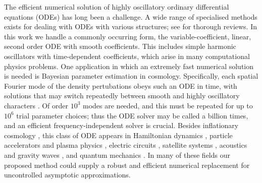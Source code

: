 \documentclass[10pt]{article}
\newcommand{\Fruzsi}[1]{{\color{blue}#1}}
\begin{document}
The efficient numerical solution of highly oscillatory ordinary differential
equations (ODEs) has long been a challenge.
A wide range of specialised methods exists for dealing with ODEs
with various structures;
see \cite{petzold1997,engquist2009} for thorough reviews.
In this work we handle a commonly occurring
form, the variable-coefficient, linear, second
order ODE with
smooth coefficients.
This includes simple %
harmonic oscillators with time-dependent coefficients,
which arise in many computational physics problems.
One application in which an extremely fast numerical solution is needed
is Bayesian parameter estimation in cosmology.
Specifically, each spatial Fourier mode of the density pertubations
obeys such an ODE in time,
with solutions that may switch repeatedly between smooth and
highly oscillatory characters \cite{agocs2020dense}.
Of order $10^3$ modes are needed, and this must be repeated for
up to $10^6$ trial parameter choices; thus the ODE solver
may be called a billion times, and an efficient frequency-independent
solver is crucial.
Besides inflationary cosmology \cite{Hergt2022,martin2003,winitzki2005}, this class of ODE appears in
Hamiltonian dynamics \cite{Pritula2018,fiore2022}, particle accelerators and plasma physics
\cite{courant1958,davidson2001,hazeltine2003,lewis1968}, electric circuits
\cite{likharev2022}, satellite systems \cite{saxena2020}, acoustics and gravity waves \cite{filippi1998,einaudi1970}, and quantum mechanics \cite{griffiths2018,adhikari1988,arnold2011wkb,cea1982}.
In many of these fields our proposed method could supply a robust and efficient
numerical replacement for
uncontrolled asymptotic approximations.
\end{document}
